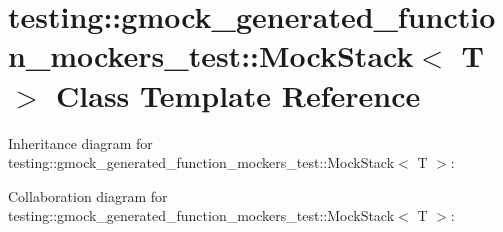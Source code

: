 \hypertarget{classtesting_1_1gmock__generated__function__mockers__test_1_1_mock_stack}{}\section{testing\+:\+:gmock\+\_\+generated\+\_\+function\+\_\+mockers\+\_\+test\+:\+:Mock\+Stack$<$ T $>$ Class Template Reference}
\label{classtesting_1_1gmock__generated__function__mockers__test_1_1_mock_stack}


Inheritance diagram for testing\+:\+:gmock\+\_\+generated\+\_\+function\+\_\+mockers\+\_\+test\+:\+:Mock\+Stack$<$ T $>$\+:


Collaboration diagram for testing\+:\+:gmock\+\_\+generated\+\_\+function\+\_\+mockers\+\_\+test\+:\+:Mock\+Stack$<$ T $>$\+:
